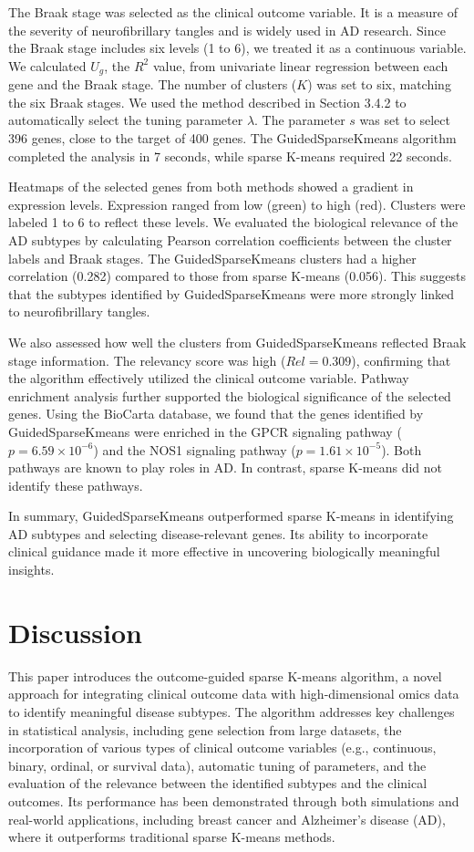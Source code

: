 \documentclass{statsoc}
\begin{document}
The Braak stage was selected as the clinical outcome variable. It is a measure of the severity of neurofibrillary tangles and is widely used in AD research. Since the Braak stage includes six levels (1 to 6), we treated it as a continuous variable. We calculated $U_g$, the $R^2$ value, from univariate linear regression between each gene and the Braak stage. The number of clusters ($K$) was set to six, matching the six Braak stages. We used the method described in Section 3.4.2 to automatically select the tuning parameter $\lambda$. The parameter $s$ was set to select 396 genes, close to the target of 400 genes. The GuidedSparseKmeans algorithm completed the analysis in 7 seconds, while sparse K-means required 22 seconds.

Heatmaps of the selected genes from both methods showed a gradient in expression levels. Expression ranged from low (green) to high (red). Clusters were labeled 1 to 6 to reflect these levels. We evaluated the biological relevance of the AD subtypes by calculating Pearson correlation coefficients between the cluster labels and Braak stages. The GuidedSparseKmeans clusters had a higher correlation (0.282) compared to those from sparse K-means (0.056). This suggests that the subtypes identified by GuidedSparseKmeans were more strongly linked to neurofibrillary tangles.

We also assessed how well the clusters from GuidedSparseKmeans reflected Braak stage information. The relevancy score was high ($Rel = 0.309$), confirming that the algorithm effectively utilized the clinical outcome variable. Pathway enrichment analysis further supported the biological significance of the selected genes. Using the BioCarta database, we found that the genes identified by GuidedSparseKmeans were enriched in the GPCR signaling pathway ($p = 6.59 \times 10^{-6}$) and the NOS1 signaling pathway ($p = 1.61 \times 10^{-5}$). Both pathways are known to play roles in AD. In contrast, sparse K-means did not identify these pathways.

In summary, GuidedSparseKmeans outperformed sparse K-means in identifying AD subtypes and selecting disease-relevant genes. Its ability to incorporate clinical guidance made it more effective in uncovering biologically meaningful insights.

\section{Discussion}
This paper introduces the outcome-guided sparse K-means algorithm, a novel approach for integrating clinical outcome data with high-dimensional omics data to identify meaningful disease subtypes. The algorithm addresses key challenges in statistical analysis, including gene selection from large datasets, the incorporation of various types of clinical outcome variables (e.g., continuous, binary, ordinal, or survival data), automatic tuning of parameters, and the evaluation of the relevance between the identified subtypes and the clinical outcomes. Its performance has been demonstrated through both simulations and real-world applications, including breast cancer and Alzheimer’s disease (AD), where it outperforms traditional sparse K-means methods.
\end{document}
